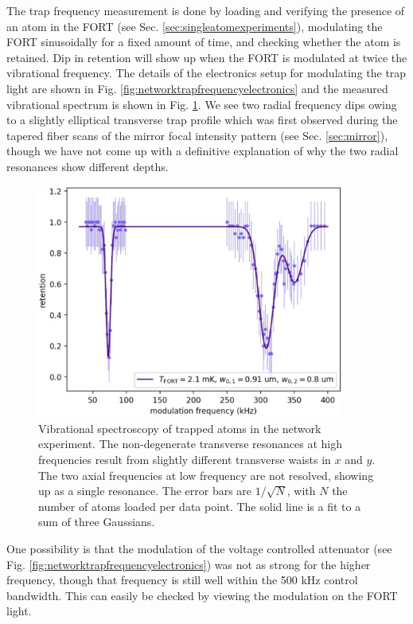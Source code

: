 The trap frequency measurement is done by loading and verifying the presence of an atom in the FORT (see Sec. \ref{sec:singleatomexperiments}), modulating the FORT sinusoidally for a fixed amount of time, and checking whether the atom is retained. Dip in retention will show up when the FORT is modulated at twice the vibrational frequency. The details of the electronics setup for modulating the trap light are shown in Fig. \ref{fig:networktrapfrequencyelectronics} and the measured vibrational spectrum is shown in Fig. \ref{fig:networktrapfrequencies}. We see two radial frequency dips owing to a slightly elliptical transverse trap profile which was first observed during the tapered fiber scans of the mirror focal intensity pattern (see Sec. \ref{sec:mirror}), though we have not come up with a definitive explanation of why the two radial resonances show different depths. 
\begin{figure}[!ht]
    \centering
    \includegraphics[width=0.9\textwidth]{Images/network_trap_frequencies_20240627.pdf}
    \caption{Vibrational spectroscopy of trapped atoms in the network experiment. The non-degenerate transverse resonances at high frequencies result from slightly different transverse waists in $x$ and $y$. The two axial frequencies at low frequency are not resolved, showing up as a single resonance. The error bars are $1/\sqrt{N}$, with $N$ the number of atoms loaded per data point. The solid line is a fit to a sum of three Gaussians.}
    \label{fig:networktrapfrequencies}
\end{figure}
One possibility is that the modulation of the voltage controlled attenuator (see Fig. \ref{fig:networktrapfrequencyelectronics}) was not as strong for the higher frequency, though that frequency is still well within the 500 kHz control bandwidth. This can easily be checked by viewing the modulation on the FORT light.
    
